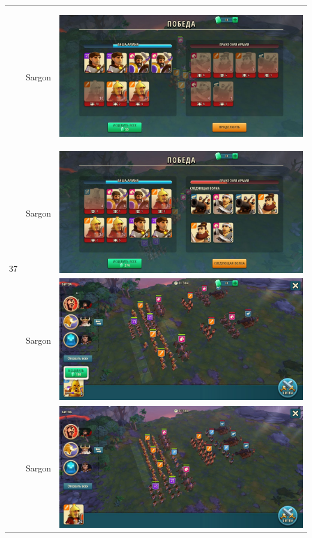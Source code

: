 \begin{longtable}{|c|c|c|}
	\hline
	\multirow{12}{*}{37} & Sargon &
	\hypertarget{fight37}{\includegraphics[width=0.75\linewidth]{./parts/media/TreasureHunt/37/sargon/photo_2022-04-07_13-17-09.jpg}} \\
	& Sargon &
	\includegraphics[width=0.75\linewidth]{./parts/media/TreasureHunt/37/sargon/photo_2022-04-07_13-16-57.jpg} \\
	& Sargon &
	\includegraphics[width=0.75\linewidth]{./parts/media/TreasureHunt/37/sargon/photo_2022-04-07_13-17-01.jpg} \\
	& Sargon &
	\includegraphics[width=0.75\linewidth]{./parts/media/TreasureHunt/37/sargon/photo_2022-04-07_13-16-49.jpg} \\

\end{longtable}
